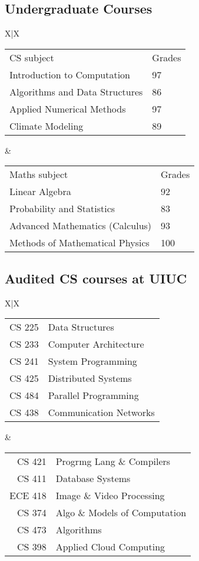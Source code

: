 \documentclass{res}
\let\oldsubsection\subsection
\renewcommand{\subsection}[1]{\vspace{-0.2in}\oldsubsection{#1}\vspace{-0.25in}}
\begin{document}
\begin{resume}
	\subsection{Undergraduate Courses}
	\begin{tabularx}{\textwidth}{X|X}
		\begin{tabular}{ll}
			CS subject                     & Grades \\
			Introduction to Computation    & 97     \\
			Algorithms and Data Structures & 86     \\
			Applied Numerical Methods      & 97     \\
			Climate Modeling               & 89     \\	
		\end{tabular}
		 & 
		\begin{tabular}{ll}
			Maths subject                   & Grades \\
			Linear Algebra                  & 92     \\
			Probability and Statistics      & 83     \\
			Advanced Mathematics (Calculus) & 93     \\
			Methods of Mathematical Physics & 100    \\
		\end{tabular}
	\end{tabularx}%
	\vspace{-0.2in}
	\subsection{Audited CS courses at UIUC}
	\vspace{0.03in}
	\begin{tabularx}{\textwidth}{X|X}
		\begin{tabular}{rl}
			CS 225 & Data Structures        \\
			CS 233 & Computer Architecture  \\
			CS 241 & System Programming     \\
			CS 425 & Distributed Systems    \\
			CS 484 & Parallel Programming   \\
			CS 438 & Communication Networks \\
		\end{tabular}
		 & 
		\begin{tabular}{rl}
			CS 421  & Progrmg Lang \& Compilers     \\
			CS 411  & Database Systems              \\
			ECE 418 & Image \& Video Processing     \\
			CS 374  & Algo \& Models of Computation \\
			CS 473  & Algorithms                    \\
			CS 398  & Applied Cloud Computing       \\
		\end{tabular}
	\end{tabularx}\\
	\vspace{-0.1in}
	

\end{resume}
\end{document}
